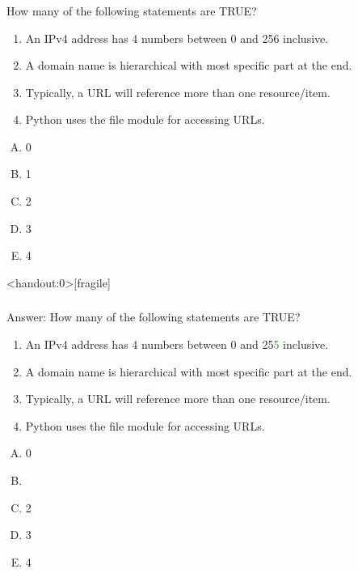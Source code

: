 \documentclass[xcolor=svgnames]{beamer}
\newcommand{\green}[1]{\textcolor{ForestGreen}{#1}}
\newcommand{\tans}[2]{\textbf<#1>{\textit<#1>{{\color<#1>{iyellow}{#2}}}}}
\newcommand{\ft}[1]{\frametitle{#1}}
\begin{document}
\begin{frame}[fragile]\ft{}
  \begin{example}
How many of the following statements are TRUE?
\begin{enumerate}
\item {{An IPv4 address has 4 numbers between 0 and 256 inclusive.}}
\item {{A domain name is hierarchical with most specific part at the end.}}
\item {{Typically, a URL will reference more than one resource/item.}}
\item {{Python uses the file module for accessing URLs.}} 
\end{enumerate}
\begin{multicols}{5}
\begin{enumerate}[A)]
\item 0 
\item 1
\item 2
\item 3
\item 4
\end{enumerate}
\end{multicols}
  \end{example} 
\end{frame}



\begin{frame}<handout:0>[fragile]\ft{}
  \begin{block}{Answer:}
How many of the following statements are TRUE?
\begin{enumerate}
\item {	{An IPv4 address has 4 numbers between 0 and 25}\green{5} {inclusive.}}
\item {	{A domain name is hierarchical with most specific part at the end.}}
\item {	{Typically, a URL will reference more than one resource/item.}}
\item {	{Python uses the file module for accessing URLs.}} 
\end{enumerate}
\begin{multicols}{5}
\begin{enumerate}[A)]
\item 0
\item \tans{4}{1} 
\item 2
\item 3
\item 4
\end{enumerate}
\end{multicols}
  \end{block} 
\end{frame}
\end{document}
